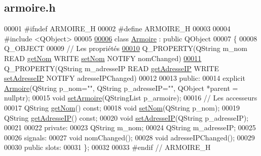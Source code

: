 \hypertarget{armoire_8h_source}{}\subsection{armoire.\+h}
\label{armoire_8h_source}

\begin{DoxyCode}
00001 \textcolor{preprocessor}{#ifndef ARMOIRE\_H}
00002 \textcolor{preprocessor}{#define ARMOIRE\_H}
00003 
00004 \textcolor{preprocessor}{#include <QObject>}
00005 
\hyperlink{class_armoire}{00006} \textcolor{keyword}{class }\hyperlink{class_armoire}{Armoire} : \textcolor{keyword}{public} QObject
00007 \{
00008     Q\_OBJECT
00009     \textcolor{comment}{// Les propriétés}
\hyperlink{class_armoire_a6d5fc6a37737b4822dc89191a79f6b7b}{00010}     Q\_PROPERTY(QString m\_nom READ \hyperlink{class_armoire_a0045e45e0c9a465af765667344ce8bee}{getNom} WRITE \hyperlink{class_armoire_ab05030741c5930bb73a8fef5b378ed37}{setNom} NOTIFY nomChanged)
\hyperlink{class_armoire_ae92e8c48f53e69b871e7f70d9af19ffa}{00011}     Q\_PROPERTY(QString m\_adresseIP READ \hyperlink{class_armoire_a5196fec5f44f63216ddce5fbc512c919}{getAdresseIP} WRITE 
      \hyperlink{class_armoire_a0be45a8a0574139b955cc1f1b51a40d6}{setAdresseIP} NOTIFY adresseIPChanged)
00012 
00013 public:
00014     explicit \hyperlink{class_armoire}{Armoire}(QString p\_nom="", QString p\_adresseIP="", QObject *parent = \textcolor{keywordtype}{nullptr});
00015     \textcolor{keywordtype}{void} \hyperlink{class_armoire_a4b35e93cee5c78739ba543162e4dbfaa}{setArmoire}(QStringList p\_armoire);
00016     \textcolor{comment}{// Les accesseurs}
00017     QString \hyperlink{class_armoire_a0045e45e0c9a465af765667344ce8bee}{getNom}() const;
00018     \textcolor{keywordtype}{void} \hyperlink{class_armoire_ab05030741c5930bb73a8fef5b378ed37}{setNom}(QString p\_nom);
00019     QString \hyperlink{class_armoire_a5196fec5f44f63216ddce5fbc512c919}{getAdresseIP}() const;
00020     \textcolor{keywordtype}{void} \hyperlink{class_armoire_a0be45a8a0574139b955cc1f1b51a40d6}{setAdresseIP}(QString p\_adresseIP);
00021 
00022 private:
00023     QString m\_nom;
00024     QString m\_adresseIP;
00025 
00026 signals:
00027     \textcolor{keywordtype}{void} nomChanged();
00028     \textcolor{keywordtype}{void} adresseIPChanged();
00029 
00030 public slots:
00031 \};
00032 
00033 \textcolor{preprocessor}{#endif // ARMOIRE\_H}
\end{DoxyCode}
